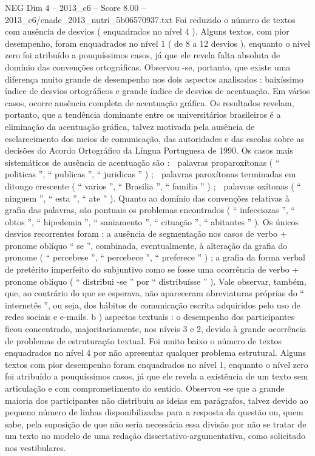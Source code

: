 \begin{textsample}{NEG Dim 4 – 2013\_c6 – Score 8.00 – 2013\_c6/enade\_2013\_nutri\_5b06570937.txt}
Foi reduzido o número de textos com ausência de desvios ( enquadrados no nível 4 ).
Alguns textos, com pior desempenho, foram enquadrados no nível 1 ( de 8 a 12 desvios ), enquanto o nível zero foi atribuído a pouquíssimos casos, já que ele revela falta absoluta de domínio das convenções ortográficas.
Observou -se, portanto, que existe uma diferença muito grande de desempenho nos dois aspectos analisados : baixíssimo índice de desvios ortográficos e grande índice de desvios de acentuação.
Em vários casos, ocorre ausência completa de acentuação gráfica.
Os resultados revelam, portanto, que a tendência dominante entre os universitários brasileiros é a eliminação da acentuação gráfica, talvez motivada pela ausência de esclarecimento dos meios de comunicação, das autoridades e das escolas sobre as decisões do Acordo Ortográfico da Língua Portuguesa de 1990.
Os casos mais sistemáticos de ausência de acentuação são :  palavras proparoxítonas ( “ politicas ”, “ publicas ”, “ juridicas ” ) ;  palavras paroxítonas terminadas em ditongo crescente ( “ varios ”, “ Brasilia ”, “ familia ” ) ;  palavras oxítonas ( “ ninguem ”, “ esta ”, “ ate ” ).
Quanto ao domínio das convenções relativas à grafia das palavras, são pontuais os problemas encontrados ( “ infecciozas ”, “ obtos ”, “ hipedemia ”, “ saniamento ”, “ cituação ”, “ abitantes ” ).
Os únicos desvios recorrentes foram : a ausência de segmentação nos casos de verbo + pronome oblíquo “ se ”, combinada, eventualmente, à alteração da grafia do pronome ( “ percebese ”, “ percebece ”, “ preferece ” ) ; a grafia da forma verbal de pretérito imperfeito do subjuntivo como se fosse uma ocorrência de verbo + pronome oblíquo ( “ distribui -se ” por “ distribuísse ” ).
Vale observar, também, que, ao contrário do que se esperava, não apareceram abreviaturas próprias do “ internetês ”, ou seja, dos hábitos de comunicação escrita adquiridos pelo uso de redes sociais e e-mails. b ) aspectos textuais : o desempenho dos participantes ficou concentrado, majoritariamente, nos níveis 3 e 2, devido à grande ocorrência de problemas de estruturação textual.
Foi muito baixo o número de textos enquadrados no nível 4 por não apresentar qualquer problema estrutural.
Alguns textos com pior desempenho foram enquadrados no nível 1, enquanto o nível zero foi atribuído a pouquíssimos casos, já que ele revela a existência de um texto sem articulação e com comprometimento do sentido.
Observou -se que a grande maioria dos participantes não distribuiu as ideias em parágrafos, talvez devido ao pequeno número de linhas disponibilizadas para a resposta da questão ou, quem sabe, pela suposição de que não seria necessária essa divisão por não se tratar de um texto no modelo de uma redação dissertativo-argumentativa, como solicitado nos vestibulares.

\end{textsample}
